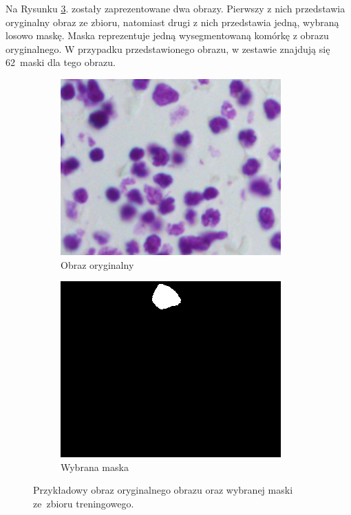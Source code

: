 \documentclass[a4paper]{article}
\begin{document}
\newline
Na Rysunku \ref{fig:examp2}. zostały zaprezentowane dwa obrazy. Pierwszy z nich przedstawia oryginalny obraz ze zbioru, natomiast drugi z nich przedstawia jedną, wybraną losowo maskę. Maska reprezentuje jedną wysegmentowaną komórkę z obrazu oryginalnego. W przypadku przedstawionego obrazu, w zestawie znajdują się 62~maski dla tego obrazu. 
\newline
\begin{figure}[h!]
\centering
\begin{subfigure}{.5\textwidth}
  \centering
  \includegraphics[width=.8\linewidth]{images/example_3.png}
  \caption{Obraz oryginalny}
  \label{fig:sub3}
\end{subfigure}%
\begin{subfigure}{.5\textwidth}
  \centering
  \includegraphics[width=.8\linewidth]{images/example_3_mask.png}
  \caption{Wybrana maska}
  \label{fig:sub4}
\end{subfigure}
\caption{Przykładowy obraz oryginalnego obrazu oraz wybranej maski ze~zbioru treningowego.}
\label{fig:examp2}
\end{figure}
\newpage
\end{document}
